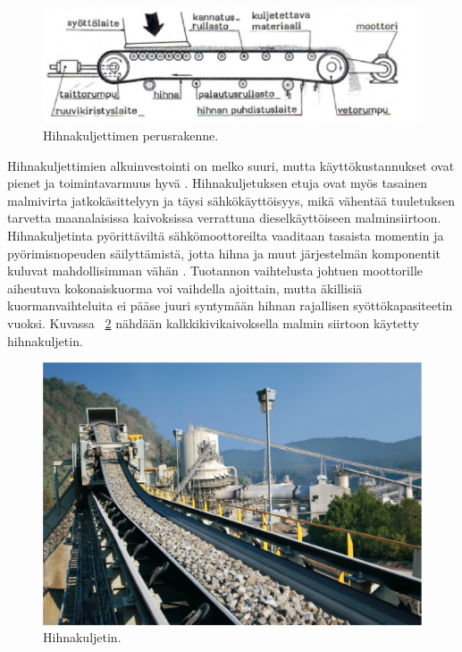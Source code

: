 \documentclass[finnish,12pt,a4paper,pdftex,elec,utf8]{aaltothesis}
\begin{document}
\begin{figure}[H]
	\begin{center}
	\includegraphics[scale=0.75]{hihnakuljetin_rakenne}
	\end{center}
	\caption{Hihnakuljettimen perusrakenne.
		\cite{Ruokolainen}}
	\label{fig:hihnakuljetin_rakenne}
\end{figure}

\noindent
Hihnakuljettimien alkuinvestointi on melko suuri, mutta käyttökustannukset ovat pienet ja toimintavarmuus hyvä \cite{Hakapää}. Hihnakuljetuksen etuja ovat myös tasainen malmivirta jatkokäsittelyyn ja täysi sähkökäyttöisyys, mikä vähentää tuuletuksen tarvetta maanalaisissa kaivoksissa verrattuna dieselkäyttöiseen malminsiirtoon. Hihnakuljetinta pyörittäviltä sähkömoottoreilta vaaditaan tasaista momentin ja pyörimisnopeuden säilyttämistä, jotta hihna ja muut järjestelmän komponentit kuluvat mahdollisimman vähän \cite{MyyntiHaastattelu}. Tuotannon vaihtelusta johtuen moottorille aiheutuva kokonaiskuorma voi vaihdella ajoittain, mutta äkillisiä kuormanvaihteluita ei pääse juuri syntymään hihnan rajallisen syöttökapasiteetin vuoksi. Kuvassa ~\ref{fig:conveyor} nähdään kalkkikivikaivoksella malmin siirtoon käytetty hihnakuljetin.

\begin{figure}[H]
	\begin{center}
	\includegraphics[scale=0.6]{conveyor}
	\end{center}
	\caption{Hihnakuljetin.
		\cite{conveyor}}
	\label{fig:conveyor}
\end{figure}
\end{document}

